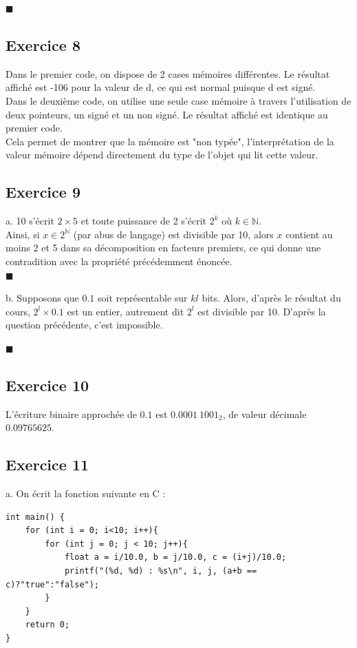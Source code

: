 \documentclass[11pt, a4 paper]{article}
\newcommand{\halmos}{\hfill$\blacksquare$}
\begin{document}
\halmos


\subsection{Exercice 8}
Dans le premier code, on dispose de 2 cases mémoires différentes.
Le résultat affiché est -106 pour la valeur de d, ce qui est normal puisque d est signé.\\
Dans le deuxième code, on utilise une seule case mémoire à travers l'utilisation de deux pointeurs, un signé et un non signé.
Le résultat affiché est identique au premier code.\\
Cela permet de montrer que la mémoire est "non typée", l'interprétation de la valeur mémoire dépend directement du type de l'objet qui lit cette valeur.

\subsection{Exercice 9}
a. 10 s'écrit $2\times5$ et toute puissance de 2 s'écrit $2^k$ où $k\in \mathbb{N}$.\\
Ainsi, si $x \in 2^{\mathbb{N}}$ (par abus de langage) est divisible par 10, alors $x$ contient au moins 2 et 5 dans sa décomposition en facteurs premiers, ce qui donne une contradition avec la propriété précédemment énoncée.\\

\halmos

b. Supposons que $0.1$ soit représentable sur $kl$ bits.
Alors, d'après le résultat du cours, $2^l \times 0.1$ est un entier, autrement dit $2^l$ est divisible par 10.
D'après la question précédente, c'est impossible.

\halmos

\subsection{Exercice 10}
L'écriture binaire approchée de $0.1$ est $0.0001~1001_2$, de valeur décimale $0.09765625$.

\subsection{Exercice 11}
a. On écrit la fonction suivante en C :

\begin{lstlisting}[style=CStyle]
int main() {
    for (int i = 0; i<10; i++){
        for (int j = 0; j < 10; j++){
            float a = i/10.0, b = j/10.0, c = (i+j)/10.0;
            printf("(%d, %d) : %s\n", i, j, (a+b == c)?"true":"false");
        }
    } 
    return 0;
}
\end{lstlisting}
\end{document}
